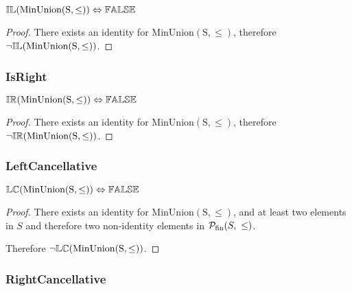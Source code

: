 \documentclass[../Summary.tex]{subfiles}
\begin{document}
\begin{theorem} \label{thm:minunion_il}
${\mathbb{IL}}(\mathrm{MinUnion(S,\leq)}) \Leftrightarrow {\mathbb{FALSE}}$
\end{theorem}

\begin{proof}
There exists an identity for $\mathrm{MinUnion(S,\leq)}$, therefore $\neg {\mathbb{IL}}(\mathrm{MinUnion(S,\leq)})$.
\end{proof}





\subsubsection{IsRight}

\begin{theorem} \label{thm:minunion_ir}
${\mathbb{IR}}(\mathrm{MinUnion(S,\leq)}) \Leftrightarrow {\mathbb{FALSE}}$
\end{theorem}

\begin{proof}
There exists an identity for $\mathrm{MinUnion(S,\leq)}$, therefore $\neg {\mathbb{IR}}(\mathrm{MinUnion(S,\leq)})$.
\end{proof}





\subsubsection{LeftCancellative}

\begin{theorem} \label{thm:minunion_lc}
${\mathbb{LC}}(\mathrm{MinUnion(S,\leq)}) \Leftrightarrow {\mathbb{FALSE}}$
\end{theorem}

\begin{proof}
There exists an identity for $\mathrm{MinUnion(S,\leq)}$, and at least two elements in $S$ and therefore two non-identity elements in ${\cal P}_{\mathrm{fin}}(S,\ \leq)$.
 
\vspace{0.5em}

Therefore $\neg {\mathbb{LC}}(\mathrm{MinUnion(S,\leq)})$.
\end{proof}




\subsubsection{RightCancellative}
\end{document}
